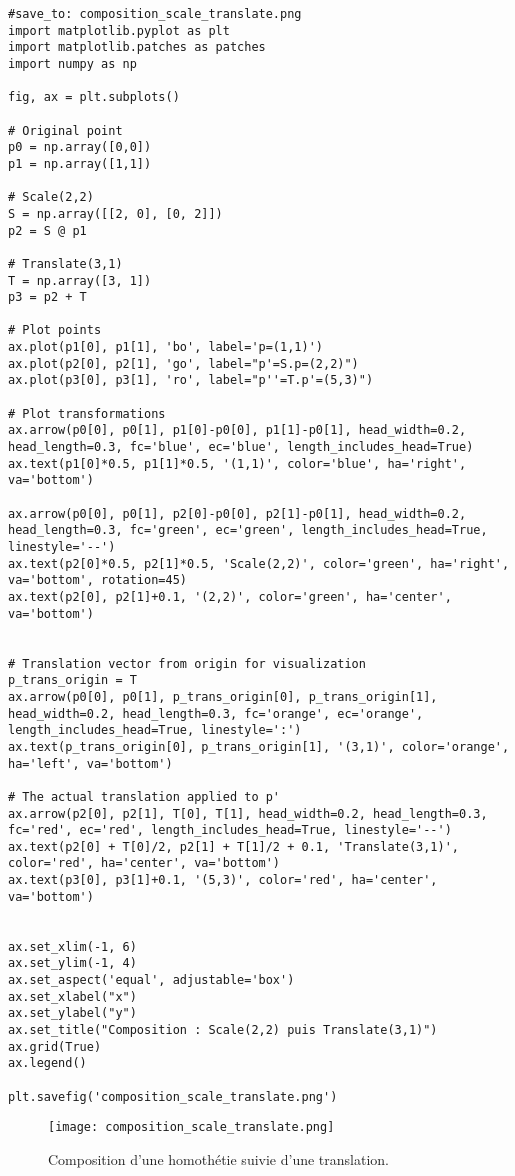 \documentclass{article}
\begin{document}
\begin{verbatim}
#save_to: composition_scale_translate.png
import matplotlib.pyplot as plt
import matplotlib.patches as patches
import numpy as np

fig, ax = plt.subplots()

# Original point
p0 = np.array([0,0])
p1 = np.array([1,1])

# Scale(2,2)
S = np.array([[2, 0], [0, 2]])
p2 = S @ p1

# Translate(3,1)
T = np.array([3, 1])
p3 = p2 + T

# Plot points
ax.plot(p1[0], p1[1], 'bo', label='p=(1,1)')
ax.plot(p2[0], p2[1], 'go', label="p'=S.p=(2,2)")
ax.plot(p3[0], p3[1], 'ro', label="p''=T.p'=(5,3)")

# Plot transformations
ax.arrow(p0[0], p0[1], p1[0]-p0[0], p1[1]-p0[1], head_width=0.2, head_length=0.3, fc='blue', ec='blue', length_includes_head=True)
ax.text(p1[0]*0.5, p1[1]*0.5, '(1,1)', color='blue', ha='right', va='bottom')

ax.arrow(p0[0], p0[1], p2[0]-p0[0], p2[1]-p0[1], head_width=0.2, head_length=0.3, fc='green', ec='green', length_includes_head=True, linestyle='--')
ax.text(p2[0]*0.5, p2[1]*0.5, 'Scale(2,2)', color='green', ha='right', va='bottom', rotation=45)
ax.text(p2[0], p2[1]+0.1, '(2,2)', color='green', ha='center', va='bottom')


# Translation vector from origin for visualization
p_trans_origin = T
ax.arrow(p0[0], p0[1], p_trans_origin[0], p_trans_origin[1], head_width=0.2, head_length=0.3, fc='orange', ec='orange', length_includes_head=True, linestyle=':')
ax.text(p_trans_origin[0], p_trans_origin[1], '(3,1)', color='orange', ha='left', va='bottom')

# The actual translation applied to p'
ax.arrow(p2[0], p2[1], T[0], T[1], head_width=0.2, head_length=0.3, fc='red', ec='red', length_includes_head=True, linestyle='--')
ax.text(p2[0] + T[0]/2, p2[1] + T[1]/2 + 0.1, 'Translate(3,1)', color='red', ha='center', va='bottom')
ax.text(p3[0], p3[1]+0.1, '(5,3)', color='red', ha='center', va='bottom')


ax.set_xlim(-1, 6)
ax.set_ylim(-1, 4)
ax.set_aspect('equal', adjustable='box')
ax.set_xlabel("x")
ax.set_ylabel("y")
ax.set_title("Composition : Scale(2,2) puis Translate(3,1)")
ax.grid(True)
ax.legend()

plt.savefig('composition_scale_translate.png')
\end{verbatim}

\begin{figure}[H]
\centering
\texttt{[image: composition\_scale\_translate.png]}
\caption{Composition d'une homothétie suivie d'une translation.}
\label{fig:composition_scale_translate}
\end{figure}
\end{document}
